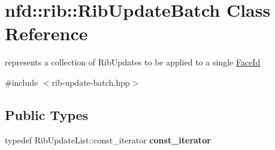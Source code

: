 \hypertarget{classnfd_1_1rib_1_1RibUpdateBatch}{}\section{nfd\+:\+:rib\+:\+:Rib\+Update\+Batch Class Reference}
\label{classnfd_1_1rib_1_1RibUpdateBatch}


represents a collection of Rib\+Updates to be applied to a single \hyperlink{classFaceId}{Face\+Id}  




{\ttfamily \#include $<$rib-\/update-\/batch.\+hpp$>$}

\subsection*{Public Types}
\begin{DoxyCompactItemize}
\item 
typedef Rib\+Update\+List\+::const\+\_\+iterator {\bfseries const\+\_\+iterator}\hypertarget{classnfd_1_1rib_1_1RibUpdateBatch_a59993e0ddf819ddfb8f8866829116c75}{}\label{classnfd_1_1rib_1_1RibUpdateBatch_a59993e0ddf819ddfb8f8866829116c75}

\end{DoxyCompactItemize}

